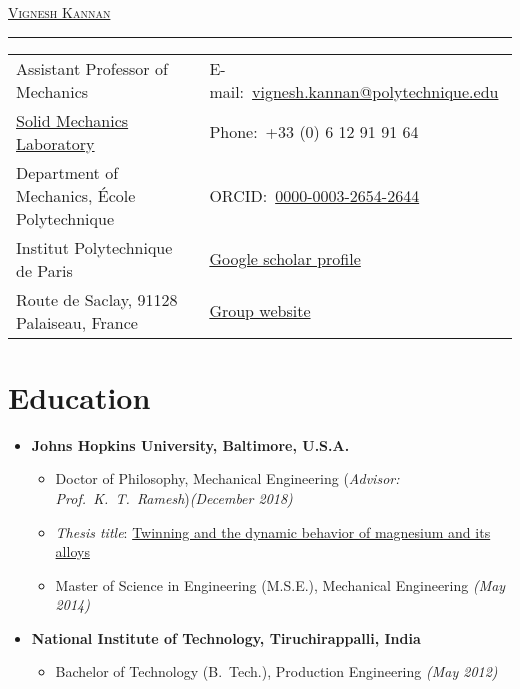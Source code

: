 \documentclass[a4paper,10pt, oneside]{article}
\begin{document}
 \thispagestyle{empty}
	
	\noindent 
	\begin{center}
		\LARGE{\textsc{\href{https://vigneshkannan-group.github.io/vk-mxm-website/}{Vignesh Kannan}}} \vspace{-0.5em}
	\end{center} 
	\noindent \rule{\textwidth}{1pt}
	\begin{tabularx}{\textwidth}{@{}l X}
		Assistant Professor of Mechanics	&	\hfill	E-mail:~\href{mailto:vignesh.kannan@polytechnique.edu}{vignesh.kannan@polytechnique.edu} \\
		\href{https://portail.polytechnique.edu/lms/fr/accueil}{Solid Mechanics Laboratory} & \hfill Phone:~+33 (0) 6 12 91 91 64 \\
		Department of Mechanics, {\'E}cole Polytechnique    &  \hfill ORCID:~\href{https://orcid.org/0000-0003-2654-2644}{0000-0003-2654-2644}\\
		Institut Polytechnique de Paris &  \hfill \href{https://scholar.google.com/citations?user=ntDAO2oAAAAJ\&hl=en\&authuser=1}{Google scholar profile}\\       
		Route de Saclay, 91128 Palaiseau, France & \hfill \href{https://vigneshkannan-group.github.io/vk-mxm-website/}{Group website}{} \\
	\end{tabularx}
	
	\section*{Education}
	\begin{itemize}[wide, labelwidth=!, labelindent=-1em]
		\item[]\textbf{Johns Hopkins University, Baltimore, U.S.A.}  
		\begin{itemize}[wide, labelwidth=!, labelindent=-1em]
			\item[] Doctor of Philosophy, Mechanical Engineering (\textit{Advisor: Prof.~K.~T.~Ramesh})\hfill \textit{(December 2018)}
			\item[]\textit{Thesis title}: \href{https://jscholarship.library.jhu.edu/handle/1774.2/61443}{Twinning and the dynamic behavior of magnesium and its alloys} 
			\vspace*{0.5em}
			\item[] Master of Science in Engineering (M.S.E.), Mechanical Engineering \hfill \textit{(May 2014)}
		\end{itemize}
		\vspace*{0.5em}
		\item[]\textbf{National Institute of Technology, Tiruchirappalli, India}
		\begin{itemize}[wide, labelwidth=!, labelindent=-1em]
			\item[] Bachelor of Technology (B.~Tech.), Production Engineering \hfill \textit{(May 2012)} 
		\end{itemize}
	\end{itemize}
	
\end{document}
